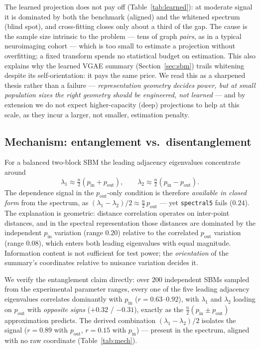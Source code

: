 \documentclass[11pt]{article}
\begin{document}
The learned projection does not pay off (Table~\ref{tab:learned}): at moderate
signal it is dominated by both the benchmark (aligned) and the whitened spectrum
(blind spot), and cross-fitting closes only about a third of the gap. The cause
is the sample size intrinsic to the problem --- tens of graph \emph{pairs}, as in
a typical neuroimaging cohort --- which is too small to estimate a projection
without overfitting; a fixed transform spends no statistical budget on
estimation. This also explains why the learned VGAE summary
(Section~\ref{sec:sbm}) trails whitening despite its self-orientation: it pays
the same price. We read this as a sharpened thesis rather than a failure ---
\emph{representation geometry decides power, but at small population sizes the
right geometry should be engineered, not learned} --- and by extension we do not
expect higher-capacity (deep) projections to help at this scale, as they incur a
larger, not smaller, estimation penalty.

\subsection{Mechanism: entanglement vs.\ disentanglement}\label{sec:mechanism}

For a balanced two-block SBM the leading adjacency eigenvalues concentrate
around
\[
\lambda_1 \approx \tfrac{n}{2}\left(p_{\mathrm{in}} + p_{\mathrm{out}}\right),
\qquad
\lambda_2 \approx \tfrac{n}{2}\left(p_{\mathrm{in}} - p_{\mathrm{out}}\right).
\]
The dependence signal in the $p_{\mathrm{out}}$-only condition is therefore
\emph{available in closed form} from the spectrum, as
$(\lambda_1 - \lambda_2)/2 \approx \tfrac{n}{2}\, p_{\mathrm{out}}$ --- yet
\texttt{spectral5} fails ($0.24$). The explanation is geometric: distance
correlation operates on inter-point distances, and in the spectral
representation those distances are dominated by the independent
$p_{\mathrm{in}}$ variation (range $0.20$) relative to the correlated
$p_{\mathrm{out}}$ variation (range $0.08$), which enters both leading
eigenvalues with equal magnitude. Information content is not sufficient for
test power; the \emph{orientation} of the summary's coordinates relative to
nuisance variation decides it.

We verify the entanglement claim directly: over $200$ independent SBMs sampled
from the experimental parameter ranges, every one of the five leading
adjacency eigenvalues correlates dominantly with $p_{\mathrm{in}}$
($r = 0.63$--$0.92$), with $\lambda_1$ and $\lambda_2$ loading on
$p_{\mathrm{out}}$ with \emph{opposite signs} ($+0.32$ / $-0.31$), exactly as
the $\tfrac{n}{2}(p_{\mathrm{in}} \pm p_{\mathrm{out}})$ approximation
predicts. The derived combination $(\lambda_1 - \lambda_2)/2$ isolates the
signal ($r = 0.89$ with $p_{\mathrm{out}}$, $r = 0.15$ with $p_{\mathrm{in}}$)
--- present in the spectrum, aligned with no raw coordinate
(Table~\ref{tab:mech}).
\end{document}
